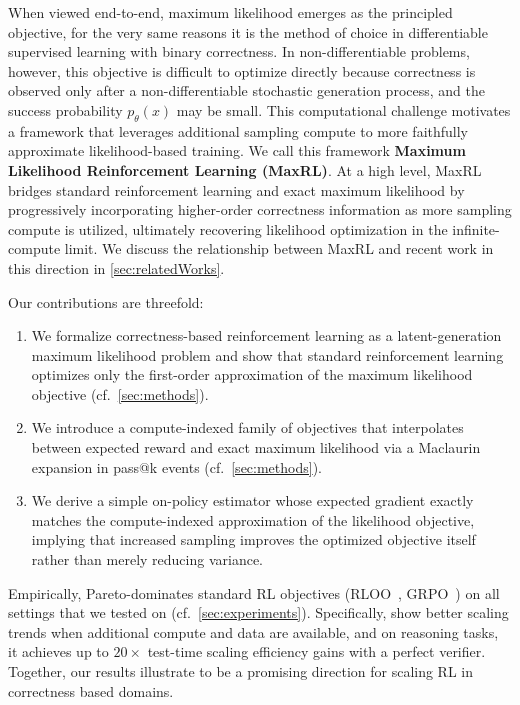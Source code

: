 \documentclass[10pt]{article} %
\begin{document}
When viewed end-to-end, maximum likelihood emerges as the principled objective, for the very same reasons it is the method of choice in differentiable supervised learning with binary correctness.
In non-differentiable problems, however, this objective is difficult to optimize
directly because correctness is observed only after a non-differentiable stochastic generation
process, and the success probability $p_\theta(x)$ may be small.
This computational challenge motivates a framework that leverages additional
sampling compute to more faithfully approximate likelihood-based training.
We call this framework \textbf{Maximum Likelihood Reinforcement Learning (MaxRL)}.
At a high level, MaxRL bridges standard reinforcement learning and exact maximum
likelihood by progressively incorporating higher-order correctness information as
more sampling compute is utilized, ultimately recovering likelihood optimization in the
infinite-compute limit.
We discuss the relationship between MaxRL and recent work in this direction 
\citep{xiong2025reinforceadaadaptivesamplingframework,davis2025objectivereasoningreinforcementlearning}
in \cref{sec:relatedWorks}.

Our contributions are threefold:
\begin{enumerate}
    \item We formalize correctness-based reinforcement learning as a latent-generation maximum likelihood problem and show that standard reinforcement learning optimizes only the first-order approximation of the maximum likelihood objective (cf.~\cref{sec:methods}).
    \item We introduce a compute-indexed family of objectives that interpolates between expected reward and exact maximum likelihood via a Maclaurin expansion in pass@k events (cf.~\cref{sec:methods}).
    \item We derive a simple on-policy estimator whose expected gradient exactly matches the compute-indexed approximation of the likelihood objective, implying that increased sampling improves the optimized objective itself rather than merely reducing variance.
\end{enumerate}

Empirically, \ours{} Pareto-dominates standard RL objectives (RLOO~\citep{ahmadian2024basicsrevisitingreinforcestyle}, GRPO~\citep{shao2024deepseekmathpushinglimitsmathematical}) on all settings that we tested on (cf.~\cref{sec:experiments}). Specifically, \ours{} show better scaling trends when additional compute and data are available, and on reasoning tasks, it achieves up to $20\times$ test-time scaling efficiency gains with a perfect verifier. Together, our results illustrate \ours{} to be a promising direction for scaling RL in correctness based domains.
\end{document}
